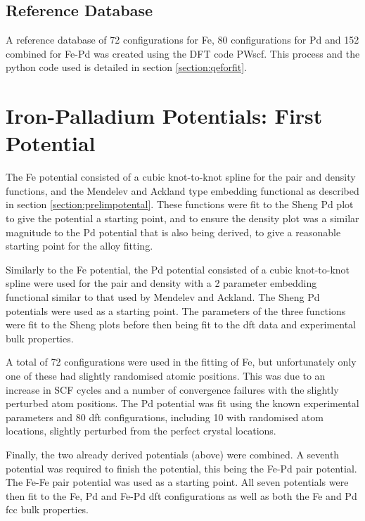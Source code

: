 \subsection{Reference Database}

A reference database of 72 configurations for Fe, 80 configurations for Pd and 152 combined for Fe-Pd was created using the DFT code PWscf.  This process and the python code used is detailed in section \ref{section:qeforfit}.




\FloatBarrier
\section{Iron-Palladium Potentials: First Potential}

The Fe potential consisted of a cubic knot-to-knot spline for the pair and density functions, and the Mendelev and Ackland type embedding functional as described in section \ref{section:prelimpotental}.  These functions were fit to the Sheng Pd plot to give the potential a starting point, and to ensure the density plot was a similar magnitude to the Pd potential that is also being derived, to give a reasonable starting point for the alloy fitting.

Similarly to the Fe potential, the Pd potential consisted of a cubic knot-to-knot spline were used for the pair and density with a 2 parameter embedding functional similar to that used by Mendelev and Ackland.  The Sheng Pd potentials were used as a starting point.  The parameters of the three functions were fit to the Sheng plots before then being fit to the \acrshort{dft} data and experimental bulk properties.

A total of 72 configurations were used in the fitting of Fe, but unfortunately only one of these had slightly randomised atomic positions.  This was due to an increase in SCF cycles and a number of convergence failures with the slightly perturbed atom positions.  The Pd potential was fit using the known experimental parameters and 80 \acrshort{dft} configurations, including 10 with randomised atom locations, slightly perturbed from the perfect crystal locations.  

Finally, the two already derived potentials (above) were combined.  A seventh potential was required to finish the potential, this being the Fe-Pd pair potential.  The Fe-Fe pair potential was used as a starting point.  All seven potentials were then fit to the Fe, Pd and Fe-Pd \acrshort{dft} configurations as well as both the Fe and Pd \acrshort{fcc} bulk properties.

